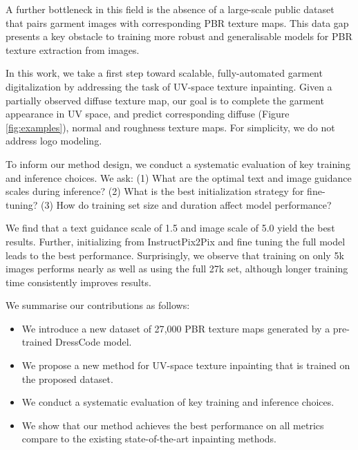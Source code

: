 \documentclass[11pt,twocolumn]{article}
\begin{document}
A further bottleneck in this field is the absence of a large-scale public dataset that pairs 
garment images with corresponding PBR texture maps. This data gap presents a key obstacle to 
training more robust and generalisable models for PBR texture extraction from images.

In this work, we take a first step toward scalable, fully-automated garment digitalization by addressing the 
task of UV-space texture inpainting. Given a partially observed diffuse texture map, our goal is to complete 
the garment appearance in UV space, and predict corresponding diffuse (Figure \ref{fig:examples}), normal and roughness 
texture maps. For simplicity, we do not address logo modeling.

To inform our method design, we conduct a systematic evaluation of key training and inference choices. 
We ask: (1) What are the optimal text and image guidance scales during inference? (2) What is the best initialization strategy for fine-tuning? (3) 
How do training set size and duration affect model performance?

We find that a text guidance scale of 1.5 and image scale of 5.0 yield the best results. 
Further, initializing from InstructPix2Pix and fine tuning the full model leads to the best performance. 
Surprisingly, we observe that training on only 5k images performs nearly as well as using the full 27k set, 
although longer training time consistently improves results.

We summarise our contributions as follows:
\begin{itemize}[itemsep=2pt, topsep=2pt]
  \item We introduce a new dataset of 27{,}000 PBR texture maps generated by a pre-trained DressCode \cite{dresscode} model.
  \item We propose a new method for UV-space texture inpainting that is trained on the proposed dataset.
  \item We conduct a systematic evaluation of key training and inference choices.
  \item We show that our method achieves the best performance on all metrics compare to the existing state-of-the-art inpainting methods.
\end{itemize}
\end{document}
